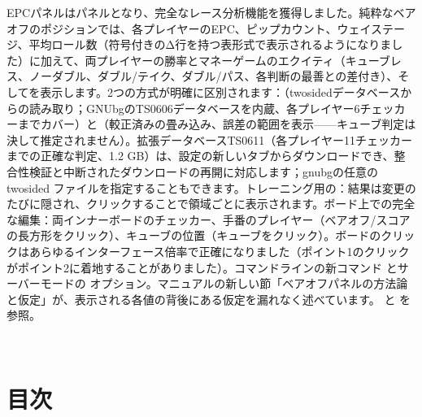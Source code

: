 \documentclass[letterpaper,10pt,dvipdfmx]{sphinxmanual}
\begin{document}
\begin{savenotes}
\begin{longtable}{}
\begin{varwidth}[t]{}
\sphinxAtStartPar
EPCパネルはパネルとなり、完全なレース分析機能を獲得しました。純粋なベアオフのポジションでは、各プレイヤーのEPC、ピップカウント、ウェイステージ、平均ロール数（符号付きのΔ行を持つ表形式で表示されるようになりました）に加えて、両プレイヤーの勝率とマネーゲームのエクイティ（キューブレス、ノーダブル、ダブル/テイク、ダブル/パス、各判断の最善との差付き）、そしてを表示します。2つの方式が明確に区別されます：（two\sphinxhyphen{}sidedデータベースからの読み取り；GNUbgのTS\sphinxhyphen{}06\sphinxhyphen{}06データベースを内蔵、各プレイヤー6チェッカーまでカバー）と（較正済みの畳み込み、誤差の範囲を表示——キューブ判定は決して推定されません）。拡張データベースTS\sphinxhyphen{}06\sphinxhyphen{}11（各プレイヤー11チェッカーまでの正確な判定、1.2 GB）は、設定の新しいタブからダウンロードでき、整合性検証と中断されたダウンロードの再開に対応します；gnubgの任意のtwo\sphinxhyphen{}sided  ファイルを指定することもできます。トレーニング用の：結果は変更のたびに隠され、クリックすることで領域ごとに表示されます。ボード上での完全な編集：両インナーボードのチェッカー、手番のプレイヤー（ベアオフ/スコアの長方形をクリック）、キューブの位置（キューブをクリック）。ボードのクリックはあらゆるインターフェース倍率で正確になりました（ポイント1のクリックがポイント2に着地することがありました）。コマンドラインの新コマンド  とサーバーモードの  オプション。マニュアルの新しい節「ベアオフパネルの方法論と仮定」が、表示される各値の背後にある仮定を漏れなく述べています。{\hyperref[\detokenize{manuel:panneau-epc}]{}} と {\hyperref[\detokenize{manuel:epc-methodologie}]{}} を参照。
\sphinxbeforeendvarwidth
\end{varwidth}%
\\
\sphinxbottomrule
\end{longtable}
\sphinxtableafterendhook
\sphinxatlongtableend
\end{savenotes}


\chapter{目次}
\label{\detokenize{index:sommaire}}
\sphinxstepscope
\end{document}

